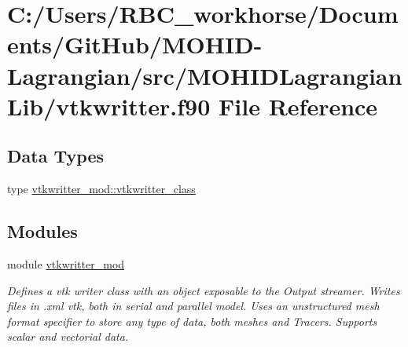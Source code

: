 \hypertarget{vtkwritter_8f90}{}\section{C\+:/\+Users/\+R\+B\+C\+\_\+workhorse/\+Documents/\+Git\+Hub/\+M\+O\+H\+I\+D-\/\+Lagrangian/src/\+M\+O\+H\+I\+D\+Lagrangian\+Lib/vtkwritter.f90 File Reference}
\label{vtkwritter_8f90}
\subsection*{Data Types}
\begin{DoxyCompactItemize}
\item 
type \mbox{\hyperlink{structvtkwritter__mod_1_1vtkwritter__class}{vtkwritter\+\_\+mod\+::vtkwritter\+\_\+class}}
\end{DoxyCompactItemize}
\subsection*{Modules}
\begin{DoxyCompactItemize}
\item 
module \mbox{\hyperlink{namespacevtkwritter__mod}{vtkwritter\+\_\+mod}}
\begin{DoxyCompactList}\small\item\em Defines a vtk writer class with an object exposable to the Output streamer. Writes files in .xml vtk, both in serial and parallel model. Uses an unstructured mesh format specifier to store any type of data, both meshes and Tracers. Supports scalar and vectorial data. \end{DoxyCompactList}\end{DoxyCompactItemize}
